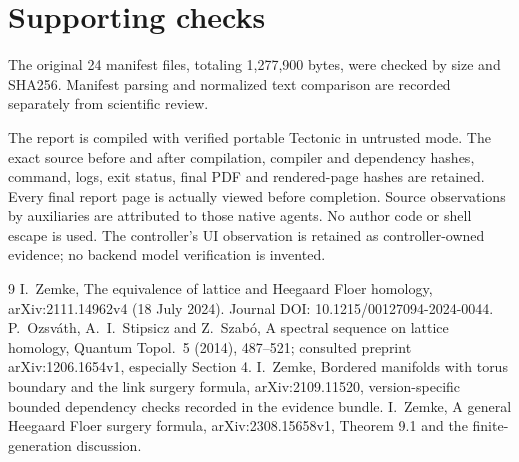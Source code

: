 \documentclass[10pt]{article}
\begin{document}
\section*{Supporting checks}
The original 24 manifest files, totaling 1,277,900 bytes, were checked by size and SHA256. Manifest parsing and normalized text comparison are recorded separately from scientific review.\par
The report is compiled with verified portable Tectonic in untrusted mode. The exact source before and after compilation, compiler and dependency hashes, command, logs, exit status, final PDF and rendered-page hashes are retained. Every final report page is actually viewed before completion. Source observations by auxiliaries are attributed to those native agents. No author code or shell escape is used. The controller’s UI observation is retained as controller-owned evidence; no backend model verification is invented.\par
9 I. Zemke, The equivalence of lattice and Heegaard Floer homology, arXiv:2111.14962v4 (18 July 2024). Journal DOI: 10.1215/00127094-2024-0044. P. Ozsváth, A. I. Stipsicz and Z. Szabó, A spectral sequence on lattice homology, Quantum Topol. 5 (2014), 487–521; consulted preprint arXiv:1206.1654v1, especially Section 4. I. Zemke, Bordered manifolds with torus boundary and the link surgery formula, arXiv:2109.11520, version-specific bounded dependency checks recorded in the evidence bundle. I. Zemke, A general Heegaard Floer surgery formula, arXiv:2308.15658v1, Theorem 9.1 and the finite-generation discussion.\par
\end{document}
